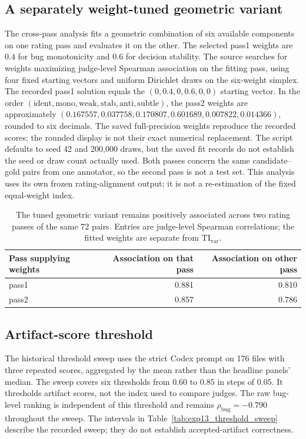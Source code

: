 \subsection{A separately weight-tuned geometric variant}
The cross-pass analysis fits a geometric combination of six available components on one rating pass and evaluates it on the other.
The selected pass1 weights are $0.4$ for bug monotonicity and $0.6$ for decision stability.
The source searches for weights maximizing judge-level Spearman association on the fitting pass, using four fixed starting vectors and uniform Dirichlet draws on the six-weight simplex.
The recorded pass1 solution equals the $(0,0.4,0,0.6,0,0)$ starting vector.
In the order $(\mathrm{ident},\mathrm{mono},\mathrm{weak},\mathrm{stab},\mathrm{anti},\mathrm{subtle})$, the pass2 weights are approximately $(0.167557,0.037758,0.170807,0.601689,0.007822,0.014366)$, rounded to six decimals.
The saved full-precision weights reproduce the recorded scores; the rounded display is not their exact numerical replacement.
The script defaults to seed 42 and 200{,}000 draws, but the saved fit records do not establish the seed or draw count actually used.
Both passes concern the same candidate--gold pairs from one annotator, so the second pass is not a test set.
This analysis uses its own frozen rating-alignment output; it is not a re-estimation of the fixed equal-weight index.

\begin{table}[h]
\centering\small
\begin{tabular}{@{}lrr@{}}
\toprule
Pass supplying weights & Association on that pass & Association on other pass \\
\midrule
pass1 & 0.881 & 0.810 \\
pass2 & 0.857 & 0.786 \\
\bottomrule
\end{tabular}
\caption{The tuned geometric variant remains positively associated across two rating passes of the same 72 pairs.
Entries are judge-level Spearman correlations; the fitted weights are separate from $\mathrm{TI}_{\mathrm{var}}$.}
\label{tab:cross_pass_generalization}
\end{table}

\subsection{Artifact-score threshold}
The historical threshold sweep uses the strict Codex prompt on 176 files with three repeated scores, aggregated by the mean rather than the headline panels' median.
The sweep covers six thresholds from $0.60$ to $0.85$ in steps of $0.05$.
It thresholds artifact scores, not the index used to compare judges.
The raw bug-level ranking is independent of this threshold and remains $\rho_{\mathrm{bug}}=-0.790$ throughout the sweep.
The intervals in Table~\ref{tab:exp13_threshold_sweep} describe the recorded sweep; they do not establish accepted-artifact correctness.


